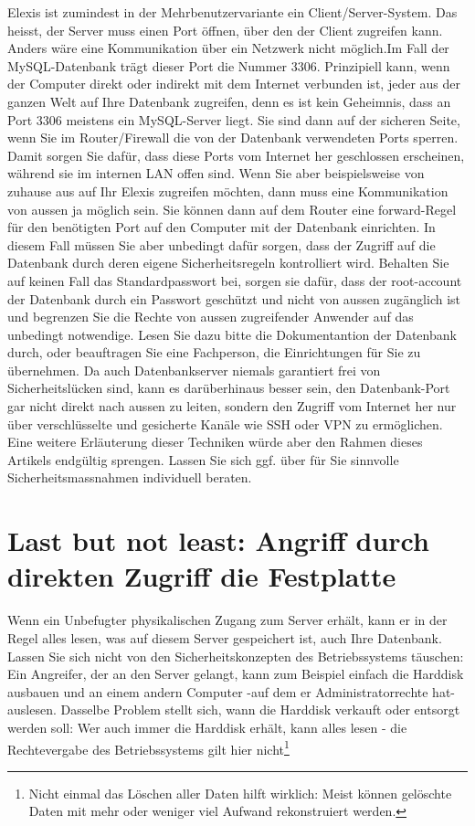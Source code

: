 Elexis ist zumindest in der Mehrbenutzervariante ein Client/Server-System. Das heisst, der Server muss einen Port öffnen,
über den der Client zugreifen kann. Anders wäre eine Kommunikation über ein Netzwerk nicht möglich.Im Fall der MySQL-Datenbank trägt dieser
Port die Nummer 3306. Prinzipiell kann, wenn der Computer direkt oder indirekt mit dem Internet verbunden ist, jeder aus der ganzen Welt auf
Ihre Datenbank zugreifen, denn es ist kein Geheimnis, dass an Port 3306 meistens ein MySQL-Server liegt. Sie sind dann auf der sicheren Seite,
wenn Sie im Router/Firewall die von der Datenbank verwendeten Ports sperren. Damit sorgen Sie dafür, dass diese Ports vom Internet her
geschlossen erscheinen, während sie im internen LAN offen sind. Wenn Sie aber beispielsweise von zuhause aus auf Ihr Elexis zugreifen
möchten, dann muss eine Kommunikation von aussen ja möglich sein. Sie können
dann auf dem Router eine \glqq forward\grqq -Regel für den benötigten
Port auf den Computer mit der Datenbank einrichten. In diesem Fall müssen Sie aber unbedingt dafür sorgen, dass der Zugriff auf die Datenbank
durch deren eigene Sicherheitsregeln kontrolliert wird. Behalten Sie auf keinen Fall das Standardpasswort bei, sorgen sie dafür, dass der
root-account der Datenbank durch ein Passwort geschützt und nicht von aussen zugänglich ist und begrenzen Sie die Rechte von aussen zugreifender
Anwender auf das unbedingt notwendige. Lesen Sie dazu bitte die Dokumentantion der Datenbank durch, oder beauftragen Sie eine Fachperson,
die Einrichtungen für Sie zu übernehmen. Da auch Datenbankserver niemals garantiert frei von Sicherheitslücken sind, kann es
darüberhinaus besser sein, den Datenbank-Port gar nicht direkt nach aussen zu leiten, sondern den Zugriff vom Internet her nur über
verschlüsselte und gesicherte Kanäle wie SSH oder VPN zu ermöglichen. Eine weitere Erläuterung dieser Techniken würde aber den Rahmen
dieses Artikels endgültig sprengen. Lassen Sie sich ggf. über für Sie sinnvolle Sicherheitsmassnahmen individuell beraten.

\section{Last but not least: Angriff durch direkten Zugriff die Festplatte}
Wenn ein Unbefugter physikalischen Zugang zum Server erhält, kann er in der Regel alles lesen, was auf diesem Server gespeichert ist, auch Ihre Datenbank. Lassen Sie sich nicht von den Sicherheitskonzepten des Betriebssystems täuschen: Ein Angreifer, der an den Server gelangt, kann zum Beispiel einfach die Harddisk ausbauen und an einem andern Computer -auf dem er Administratorrechte hat- auslesen. Dasselbe Problem stellt sich, wann die Harddisk verkauft oder entsorgt werden soll: Wer auch immer die Harddisk erhält, kann alles lesen - die Rechtevergabe des Betriebssystems gilt hier nicht\footnote{Nicht einmal das Löschen aller Daten hilft wirklich: Meist können gelöschte Daten mit mehr oder weniger viel Aufwand rekonstruiert werden.}

